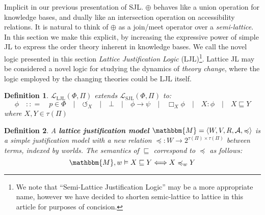 \documentclass{article}
\newcommand{\tmem}[1]{{\em #1\/}}
\newcommand{\tmop}[1]{\ensuremath{\operatorname{#1}}}
\newcommand{\tmstrong}[1]{\textbf{#1}}
\newcommand{\tmtextit}[1]{{\itshape{#1}}}
\newtheorem{definition}{Definition}
\begin{document}
Implicit in our previous presentation of SJL.  $\oplus$ behaves like a union
operation for knowledge bases, and dually like an intersection operation on
accessibility relations.  It is natural to think of $\oplus$ as a join/meet
operator over a {\tmem{semi-lattice}}.  In this section we make this
explicit, by increasing the expressive power of simple JL to express the order
theory inherent in knowledge bases.  We call the novel logic presented in
this section \tmtextit{Lattice Justification Logic} (LJL){\footnote{We note
that ``Semi-Lattice Justification Logic'' may be a more appropriate name,
however we have decided to shorten semic-lattice to lattice in this article
for purposes of concision.}}.  Lattice JL may be considered a novel logic for
studying the dynamics of \tmtextit{theory change}, where the logic employed by
the changing theories could be LJL itself.



\begin{definition}
  $\mathcal{L}_{\tmop{LJL}} (\Phi, \Pi)$ extends $\mathcal{L}_{\tmop{SJL}}
  (\Phi, \Pi)$ to:
  \[ \phi \hspace{1em} : : = \hspace{1em} p \in \Phi \hspace{1em} |
     \hspace{1em} \circlearrowleft_X \hspace{1em} | \hspace{1em} \bot
     \hspace{1em} | \hspace{1em} \phi \rightarrow \psi \hspace{1em} |
     \hspace{1em} \Box_X \phi \hspace{1em} | \hspace{1em} X : \phi
     \hspace{1em} | \hspace{1em} X \sqsubseteq Y \]
  where $X, Y \in \tau (\Pi)$
\end{definition}

\begin{definition}
  \label{justmodels}A {\tmstrong{lattice justification model}} $\mathbbm{M}=
  \langle W, V, R, \mathcal{A}, \preccurlyeq \rangle$ is a simple
  justification model with a new relation $\preccurlyeq : W \rightarrow
  2^{\tau (\Pi) \times \tau (\Pi)}$ between terms, indexed by worlds.  The
  semantics of $\sqsubseteq$ correspond to $\preccurlyeq$ as follows:
  \[ \mathbbm{M}, w \vDash X \sqsubseteq Y \Longleftrightarrow X
     \preccurlyeq_w Y \]
\end{definition}
\end{document}

